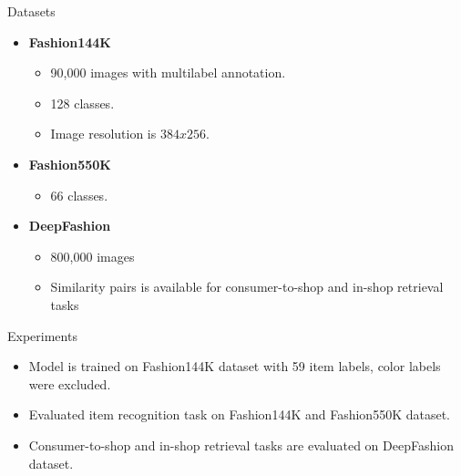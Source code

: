\documentclass[handout]{beamer}
\begin{document}
\begin{frame}{Datasets}
  \begin{itemize}
    \item \textbf{Fashion144K \cite{SimoSerraCVPR2016}}
    \begin{itemize}
      \item 90,000 images with multilabel annotation.
      \item 128 classes.
      \item Image resolution is $384x256$.
    \end{itemize}

    \item \textbf{Fashion550K \cite{InoueICCVW2017}}
      \begin{itemize}
        \item 66 classes.
      \end{itemize}

    \item \textbf{DeepFashion \cite{LiuCVPR2016}}
      \begin{itemize}
        \item 800,000 images
        \item Similarity pairs is available for consumer-to-shop and in-shop retrieval tasks
      \end{itemize}
  \end{itemize}
\end{frame}

\begin{frame}{Experiments}
  \begin{itemize}
    \item Model is trained on Fashion144K \cite{SimoSerraCVPR2016} dataset with 59 item labels, color labels were excluded.
    \item Evaluated item recognition task on Fashion144K \cite{SimoSerraCVPR2016} and Fashion550K \cite{InoueICCVW2017} dataset.
    \item Consumer-to-shop and in-shop retrieval tasks are evaluated on DeepFashion \cite{LiuCVPR2016} dataset.
  \end{itemize}
\end{frame}
\end{document}
